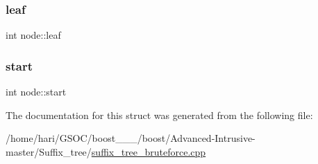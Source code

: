 \subsubsection{\texorpdfstring{leaf}{leaf}}
{\footnotesize\ttfamily int node\+::leaf}

\mbox{\label{structnode_a224812f32f1af1c657f6a49be49ae83e}} 
\subsubsection{\texorpdfstring{start}{start}}
{\footnotesize\ttfamily int node\+::start}



The documentation for this struct was generated from the following file\+:\begin{DoxyCompactItemize}
\item 
/home/hari/\+G\+S\+O\+C/boost\+\_\+\_\+\_/boost/\+Advanced-\/\+Intrusive-\/master/\+Suffix\+\_\+tree/\hyperlink{suffix__tree__bruteforce_8cpp}{suffix\+\_\+tree\+\_\+bruteforce.\+cpp}\end{DoxyCompactItemize}
